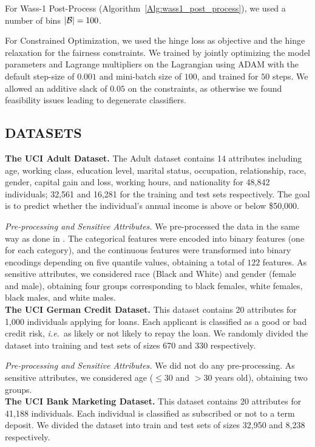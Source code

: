 \documentclass[letterpaper]{article}
\newcommand{\ie}{\emph{i.e.}}
\theoremstyle{definition}
\begin{document}
For Wass-1 Post-Process (Algorithm~\ref{Alg:wass1_post_process}), we used a number of bins $|{\cal B}|= 100$.

For Constrained Optimization, we used the hinge loss as objective and the hinge relaxation for the fairness constraints. We trained by jointly optimizing the model parameters and Lagrange multipliers on the Lagrangian using ADAM with the default step-size of $0.001$ and mini-batch size of $100$, and trained for $50$ steps. We allowed an additive slack of $0.05$ on the constraints, as otherwise we found feasibility issues leading to degenerate classifiers.

\subsection{DATASETS} 
{\bf The UCI Adult Dataset.}
The Adult dataset contains 14 attributes including age, working class, education level, marital status, occupation, relationship, race, gender, capital gain and loss, working hours, and nationality for 48,842 individuals; 32,561 and 16,281 for the training and test sets respectively. The goal is to predict whether the individual's annual income is above or below \$50,000. 

\emph{Pre-processing and Sensitive Attributes.} We pre-processed the data in the same way as done in \cite{zafar17fairness,goh16satisfying}. The categorical features were encoded into binary features (one for each category), and the continuous features were transformed into binary encodings depending on five quantile values, obtaining a total of $122$ features.
As sensitive attributes, we considered race (Black and White) and gender (female and male), obtaining four groups corresponding to black females, white females, black males, and white males.\\

{\bf The UCI German Credit Dataset.}
This dataset contains 20 attributes for 1,000 individuals applying for loans. Each applicant is classified as a good or bad credit risk, \ie~as likely or not likely to repay the loan. We randomly divided the dataset into training and test sets of sizes 670 and 330 respectively. 

\emph{Pre-processing and Sensitive Attributes.} We did not do any pre-processing. As sensitive attributes, we considered age ($\leq 30$ and $>30$ years old), obtaining two groups.\\

{\bf The UCI Bank Marketing Dataset.}
This dataset contains 20 attributes for 41,188 individuals. 
Each individual is classified as subscribed or not to a term deposit. We divided the dataset into train and test sets of sizes 32,950 and 8,238 respectively.
\end{document}

